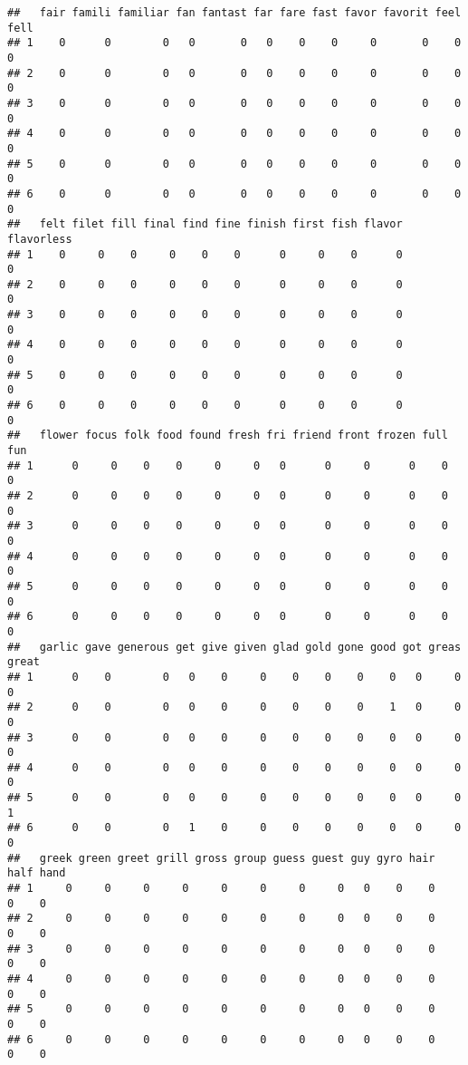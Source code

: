 \documentclass[]{article}
\begin{document}
\begin{verbatim}
##   fair famili familiar fan fantast far fare fast favor favorit feel fell
## 1    0      0        0   0       0   0    0    0     0       0    0    0
## 2    0      0        0   0       0   0    0    0     0       0    0    0
## 3    0      0        0   0       0   0    0    0     0       0    0    0
## 4    0      0        0   0       0   0    0    0     0       0    0    0
## 5    0      0        0   0       0   0    0    0     0       0    0    0
## 6    0      0        0   0       0   0    0    0     0       0    0    0
##   felt filet fill final find fine finish first fish flavor flavorless
## 1    0     0    0     0    0    0      0     0    0      0          0
## 2    0     0    0     0    0    0      0     0    0      0          0
## 3    0     0    0     0    0    0      0     0    0      0          0
## 4    0     0    0     0    0    0      0     0    0      0          0
## 5    0     0    0     0    0    0      0     0    0      0          0
## 6    0     0    0     0    0    0      0     0    0      0          0
##   flower focus folk food found fresh fri friend front frozen full fun
## 1      0     0    0    0     0     0   0      0     0      0    0   0
## 2      0     0    0    0     0     0   0      0     0      0    0   0
## 3      0     0    0    0     0     0   0      0     0      0    0   0
## 4      0     0    0    0     0     0   0      0     0      0    0   0
## 5      0     0    0    0     0     0   0      0     0      0    0   0
## 6      0     0    0    0     0     0   0      0     0      0    0   0
##   garlic gave generous get give given glad gold gone good got greas great
## 1      0    0        0   0    0     0    0    0    0    0   0     0     0
## 2      0    0        0   0    0     0    0    0    0    1   0     0     0
## 3      0    0        0   0    0     0    0    0    0    0   0     0     0
## 4      0    0        0   0    0     0    0    0    0    0   0     0     0
## 5      0    0        0   0    0     0    0    0    0    0   0     0     1
## 6      0    0        0   1    0     0    0    0    0    0   0     0     0
##   greek green greet grill gross group guess guest guy gyro hair half hand
## 1     0     0     0     0     0     0     0     0   0    0    0    0    0
## 2     0     0     0     0     0     0     0     0   0    0    0    0    0
## 3     0     0     0     0     0     0     0     0   0    0    0    0    0
## 4     0     0     0     0     0     0     0     0   0    0    0    0    0
## 5     0     0     0     0     0     0     0     0   0    0    0    0    0
## 6     0     0     0     0     0     0     0     0   0    0    0    0    0

\end{verbatim}
\end{document}
